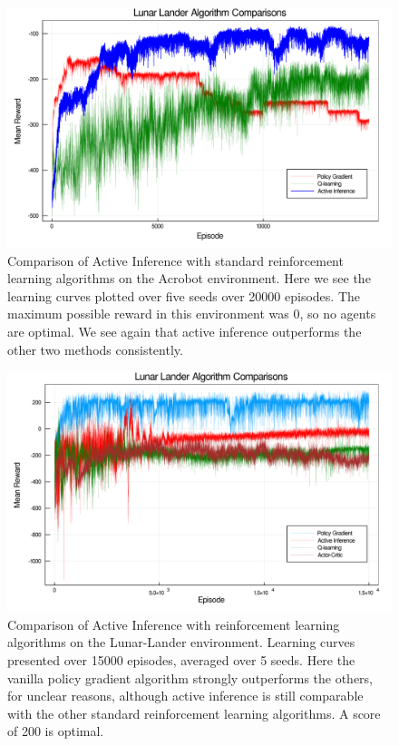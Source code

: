 \begin{figure}[H]
\centering
    \includegraphics[scale=0.08]{chapter_4_figures/Acrobot_Comparison_Graph.png}
    \caption{Comparison of Active Inference with standard reinforcement learning algorithms on the Acrobot environment. Here we see the learning curves plotted over five seeds over 20000 episodes. The maximum possible reward in this environment was 0, so no agents are optimal. We see again that active inference outperforms the other two methods consistently.}
\end{figure}
\bigskip
\begin{figure}[H]
    \centering
    \includegraphics[scale=0.08]{chapter_4_figures/Lunar_Lander_Comparison_Graph.png}
    \caption{Comparison of Active Inference with reinforcement learning algorithms on the Lunar-Lander environment. Learning curves presented over 15000 episodes, averaged over 5 seeds. Here the vanilla policy gradient algorithm strongly outperforms the others, for unclear reasons, although active inference is still comparable with the other standard reinforcement learning algorithms. A score of 200 is optimal.}
\end{figure}

